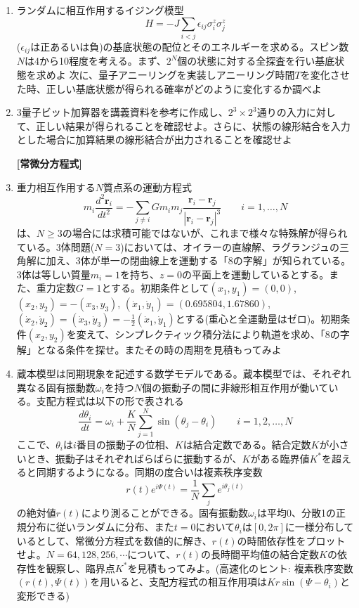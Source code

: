 \documentclass[11pt]{jarticle}
\begin{document}
\begin{enumerate}
\item ランダムに相互作用するイジング模型
  \[
  H = -J \sum_{i<j} \epsilon_{ij} \sigma_i^z \sigma_j^z
  \]
  ($\epsilon_{ij}$は正あるいは負)の基底状態の配位とそのエネルギーを求める。スピン数$N$は4から10程度を考える。まず、$2^N$個の状態に対する全探査を行い基底状態を求めよ
  次に、量子アニーリングを実装しアニーリング時間$T$を変化させた時、正しい基底状態が得られる確率がどのように変化するか調べよ

\item 3量子ビット加算器を講義資料を参考に作成し、$2^3 \times 2^3$通りの入力に対して、正しい結果が得られることを確認せよ。さらに、状態の線形結合を入力とした場合に加算結果の線形結合が出力されることを確認せよ

\hspace*{-2em} {\bf [常微分方程式]}


\item 重力相互作用する$N$質点系の運動方程式
  \[
  m_i \frac{d^2 \mathbf{r}_i}{dt^2} = - \sum_{j \ne i} G m_i m_j \frac{\mathbf{r}_i - \mathbf{r}_j}{|\mathbf{r}_i - \mathbf{r}_j|^3} \qquad i = 1,\ldots,N
  \]
  は、$N \ge 3$の場合には求積可能ではないが、これまで様々な特殊解が得られている。3体問題($N=3$)においては、オイラーの直線解、ラグランジュの三角解に加え、3体が単一の閉曲線上を運動する「8の字解」が知られている。3体は等しい質量$m_i=1$を持ち、$z=0$の平面上を運動しているとする。また、重力定数$G=1$とする。初期条件として$(x_1,y_1)=(0,0)$, $(x_2,y_2)=-(x_3,y_3)$, $(\dot{x}_1,\dot{y}_1)=(0.695804,1.67860)$, $(\dot{x}_2,\dot{y}_2)=(\dot{x}_3,\dot{y}_3)=-\frac{1}{2}(\dot{x}_1,\dot{y}_1)$とする(重心と全運動量はゼロ)。初期条件$(x_2,y_2)$を変えて、シンプレクティック積分法により軌道を求め、「8の字解」となる条件を探せ。またその時の周期を見積もってみよ
  \begin{center}
  \end{center}
  
\item 蔵本模型は同期現象を記述する数学モデルである。蔵本模型では、それぞれ異なる固有振動数$\omega_i$を持つ$N$個の振動子の間に非線形相互作用が働いている。支配方程式は以下の形で表される
  \[
  \frac{d\theta_i}{dt} = \omega_i + \frac{K}{N} \sum_{j=1}^N \sin(\theta_j - \theta_i) \qquad i=1,2,\ldots,N
  \]
  ここで、$\theta_i$は$i$番目の振動子の位相、$K$は結合定数である。結合定数$K$が小さいとき、振動子はそれぞればらばらに振動するが、$K$がある臨界値$K^*$を超えると同期するようになる。同期の度合いは複素秩序変数
  \[
  r(t) e^{i\Psi(t)} = \frac{1}{N} \sum_j e^{i\theta_j(t)}
  \]
  の絶対値$r(t)$により測ることができる。固有振動数$\omega_i$は平均0、分散1の正規分布に従いランダムに分布、また$t=0$において$\theta_i$は$[0,2\pi]$に一様分布しているとして、常微分方程式を数値的に解き、$r(t)$の時間依存性をプロットせよ。$N=64,128,256,\cdots$について、$r(t)$の長時間平均値の結合定数$K$の依存性を観察し、臨界点$K^*$を見積もってみよ。(高速化のヒント: 複素秩序変数$(r(t),\Psi(t))$を用いると、支配方程式の相互作用項は$K r \sin(\Psi-\theta_i)$と変形できる)


\end{enumerate}
\end{document}
